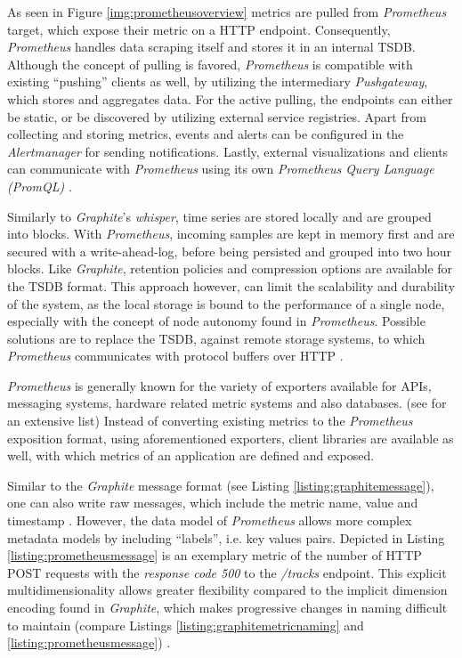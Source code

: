 As seen in Figure \ref{img:prometheusoverview} metrics are pulled from \textit{Prometheus} target, which expose their metric on a \ac{HTTP} endpoint.
Consequently, \textit{Prometheus} handles data scraping itself and stores it in an internal \ac{TSDB}.
Although the concept of pulling is favored, \textit{Prometheus} is compatible with existing \enquote{pushing} clients as well, by utilizing the intermediary \textit{Pushgateway}, which stores and aggregates data.
For the active pulling, the endpoints can either be static, or be discovered by utilizing external service registries.
Apart from collecting and storing metrics, events and alerts can be configured in the \textit{Alertmanager} for sending notifications.
Lastly, external visualizations and clients can communicate with \textit{Prometheus} using its own \textit{Prometheus Query Language (PromQL)} \cite{PrometheusAuthors.30.05.2020}.

Similarly to \textit{Graphite}'s \textit{whisper}, time series are stored locally and are grouped into blocks.
With \textit{Prometheus}, incoming samples are kept in memory first and are secured with a write-ahead-log, before being persisted and grouped into two hour blocks.
Like \textit{Graphite}, retention policies and compression options are available for the \ac{TSDB} format.
This approach however, can limit the scalability and durability of the system, as the local storage is bound to the performance of a single node, especially with the concept of node autonomy found in \textit{Prometheus}.
Possible solutions are to replace the \ac{TSDB}, against remote storage systems, to which \textit{Prometheus} communicates with protocol buffers over \ac{HTTP} \cite{PrometheusAuthors.30.05.2020b}.

\textit{Prometheus} is generally known for the variety of exporters available for \acp{API}, messaging systems, hardware related metric systems and also databases. (see \cite{PrometheusAuthors.30.05.2020c} for an extensive list)
Instead of converting existing metrics to the \textit{Prometheus} exposition format, using aforementioned exporters, client libraries are available as well, with which metrics of an application are defined and exposed.

Similar to the \textit{Graphite} message format (see Listing \ref{listing:graphitemessage}), one can also write raw messages, which include the metric name, value and timestamp \cite{PrometheusAuthors.30.05.2020d}.
However, the data model of \textit{Prometheus} allows more complex metadata models by including \enquote{labels}, i.e. key values pairs.
Depicted in Listing \ref{listing:prometheusmessage} is an exemplary metric of the number of HTTP POST requests with the \textit{response code 500} to the \textit{/tracks} endpoint.
This explicit multidimensionality allows greater flexibility compared to the implicit dimension encoding found in \textit{Graphite}, which makes progressive changes in naming difficult to maintain (compare Listings \ref{listing:graphitemetricnaming} and \ref{listing:prometheusmessage}) \cite{Berman.2018}\cite{PrometheusAuthors.30.05.2020e}.

